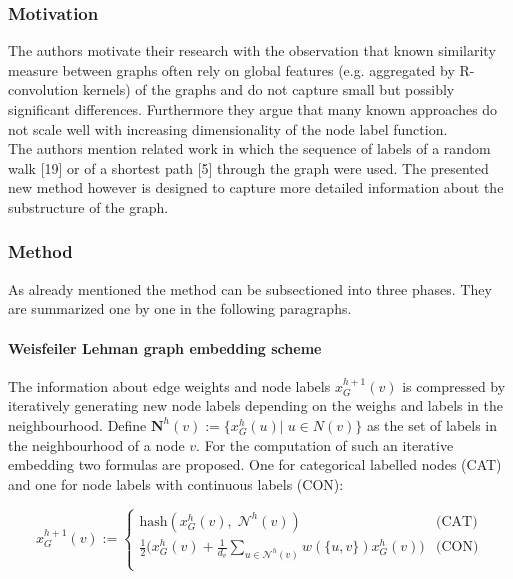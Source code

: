 \documentclass[twoside]{scrartcl}
\begin{document}
\subsubsection{Motivation}
The authors motivate their research with the observation that known similarity measure between graphs often rely on global features (e.g. aggregated by R-convolution kernels) of the graphs and do not capture small but possibly significant differences. Furthermore they argue that many known approaches do not scale well with increasing dimensionality of the node label function.\\

The authors mention related work in which the sequence of labels of a random walk [19] %
or of a shortest path [5] %
through the graph were used. The presented new method however is designed to capture more detailed information about the substructure of the graph.

\subsubsection{Method}
As already mentioned the method can be subsectioned into three phases. They are summarized one by one in the following paragraphs.

\paragraph{Weisfeiler Lehman graph embedding scheme} The information about edge weights and node labels $x^{h+1}_G(v)$ is compressed by iteratively generating new node labels depending on the weighs and labels in the neighbourhood. Define $\mathbf{N}^h(v):=\{x^{h}_G(u)|\; u\in N(v)\}$ as the set of labels in the neighbourhood of a node $v$. For the computation of such an iterative embedding two formulas are proposed. One for categorical labelled nodes (CAT) and one for node labels with continuous labels (CON): 

\[ x^{h+1}_G(v) := \begin{cases}
\text{hash}(x^{h}_G(v), \; \mathcal{N}^h(v)) & \text{(CAT)}\\ 
\frac{1}{2}\Big(x^{h}_G(v) + \frac{1}{d_v} \sum_{u\in \mathcal{N}^h(v)}w(\{u,v\})x^{h}_G(v)\Big)  & \text{(CON)}\\ 
\end{cases} \]

\end{document}
